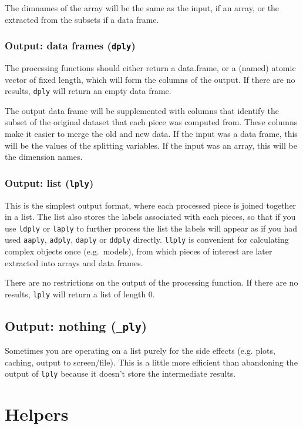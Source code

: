 \documentclass[letterpage]{scrartcl}
\begin{document}
The dimnames of the array will be the same as the input, if an array, or the extracted from the subsets if a data frame.

\subsubsection{Output: data frames ({\tt *dply})}

The processing functions should either return a data.frame, or a (named) atomic vector of fixed length, which will form the columns of the output. If there are no results, {\tt *dply} will return an empty data frame.

The output data frame will be supplemented with columns that identify the subset of the original dataset that each piece was computed from.  These columns make it easier to merge the old and new data.  If the input was a data frame, this will be the values of the splitting variables.  If the input was an array, this will be the dimension names.

\subsubsection{Output: list ({\tt *lply})}

This is the simplest output format, where each processed piece is joined together in a list.  The list also stores the labels associated with each pieces, so that if you use {\tt ldply} or {\tt laply} to further process the list the labels will appear as if you had used {\tt aaply}, {\tt adply}, {\tt daply} or {\tt ddply} directly.  {\tt llply} is convenient for calculating complex objects once (e.g.\ models), from which pieces of interest are later extracted into arrays and data frames.

There are no restrictions on the output of the processing function.  If there are no results, {\tt *lply} will return a list of length 0.

\subsection{Output: nothing ({\tt *\_ply})}

Sometimes you are operating on a list purely for the side effects (e.g. plots, caching, output to screen/file).  This is a little more efficient than abandoning the output of {\tt *lply} because it doesn't store the intermediate results.

\section{Helpers}
\label{sec:helpers}
\end{document}
